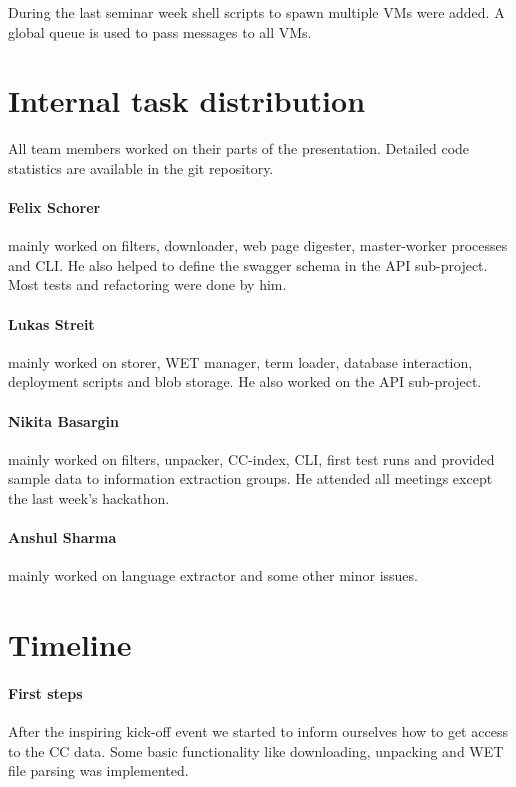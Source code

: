 \documentclass[DIV=calc, paper=a4, fontsize=11pt, twocolumn]{scrartcl}
\begin{document}
During the last seminar week shell scripts to spawn multiple VMs were added. A global queue is used to pass messages to all VMs.


\section*{Internal task distribution}
All team members worked on their parts of the presentation. 
Detailed code statistics are available in the git repository. 

\paragraph{Felix Schorer} mainly worked on filters, downloader, web page digester, master-worker processes and CLI. 
He also helped to define the swagger schema in the API sub-project. 
Most tests and refactoring were done by him.

\paragraph{Lukas Streit} mainly worked on storer, WET manager, term loader, database interaction, deployment scripts and blob storage. 
He also worked on the API sub-project.

\paragraph{Nikita Basargin} mainly worked on filters, unpacker, CC-index, CLI, first test runs and provided sample data to information extraction groups. 
He attended all meetings except the last week's hackathon.

\paragraph{Anshul Sharma} mainly worked on language extractor and some other minor issues.



\section*{Timeline}
\paragraph{First steps}
After the inspiring kick-off event we started to inform ourselves how to get access to the CC data. 
Some basic functionality like downloading, unpacking and WET file parsing was implemented.
\end{document}
